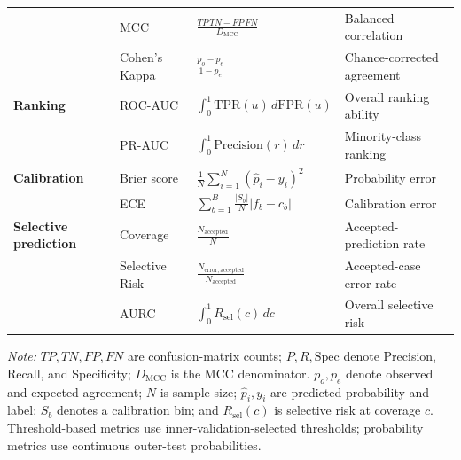 \documentclass[pdflatex,sn-mathphys-num]{sn-jnl}%
\theoremstyle{thmstyleone}%
\theoremstyle{thmstyletwo}%
\theoremstyle{thmstylethree}%
\begin{document}
\begin{table}[!ht]
\begin{tabularx}{\textwidth}{@{}
>{\raggedright\arraybackslash}p{2.2cm}
>{\raggedright\arraybackslash}p{2.0cm}
>{\centering\arraybackslash}p{5.2cm}
>{\raggedright\arraybackslash}X
@{}}
&
MCC
&
\(\displaystyle
\frac{TP\,TN-FP\,FN}{D_{\mathrm{MCC}}}
\)
&
Balanced correlation
\\

&
Cohen's Kappa
&
\(\displaystyle
\frac{p_o-p_e}{1-p_e}
\)
&
Chance-corrected agreement
\\

\midrule

\textbf{Ranking}
&
ROC-AUC
&
\(\displaystyle
\int_{0}^{1}
\mathrm{TPR}(u)\,d\mathrm{FPR}(u)
\)
&
Overall ranking ability
\\

&
PR-AUC
&
\(\displaystyle
\int_{0}^{1}
\mathrm{Precision}(r)\,dr
\)
&
Minority-class ranking
\\

\midrule

\textbf{Calibration}
&
Brier score
&
\(\displaystyle
\frac{1}{N}
\sum_{i=1}^{N}
(\widehat{p}_i-y_i)^2
\)
&
Probability error
\\

&
ECE
&
\(\displaystyle
\sum_{b=1}^{B}
\frac{|S_b|}{N}
|f_b-c_b|
\)
&
Calibration error
\\

\midrule

\textbf{Selective prediction}
&
Coverage
&
\(\displaystyle
\frac{N_{\mathrm{accepted}}}{N}
\)
&
Accepted-prediction rate
\\

&
Selective Risk
&
\(\displaystyle
\frac{N_{\mathrm{error,accepted}}}
{N_{\mathrm{accepted}}}
\)
&
Accepted-case error rate
\\

&
AURC
&
\(\displaystyle
\int_{0}^{1}
R_{\mathrm{sel}}(c)\,dc
\)
&
Overall selective risk
\\

\bottomrule
\end{tabularx}

\vspace{2pt}

\begin{minipage}{0.98\textwidth}
\footnotesize
\textit{Note:}
\(TP,TN,FP,FN\) are confusion-matrix counts; \(P,R,\mathrm{Spec}\) denote
Precision, Recall, and Specificity; \(D_{\mathrm{MCC}}\) is the MCC denominator.
\(p_o,p_e\) denote observed and expected agreement; \(N\) is sample size;
\(\widehat{p}_i,y_i\) are predicted probability and label; \(S_b\) denotes a
calibration bin; and \(R_{\mathrm{sel}}(c)\) is selective risk at coverage \(c\).
Threshold-based metrics use inner-validation-selected thresholds; probability
metrics use continuous outer-test probabilities.
\end{minipage}

\end{table}
\end{document}
